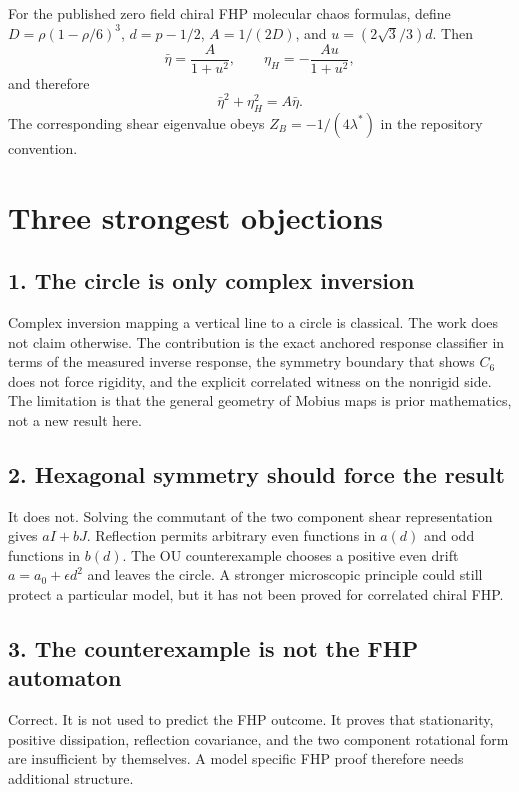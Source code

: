\documentclass[11pt,a4paper]{article}
\begin{document}
For the published zero field chiral FHP molecular chaos formulas, define $D=\rho(1-\rho/6)^3$, $d=p-1/2$, $A=1/(2D)$, and $u=(2\sqrt3/3)d$. Then
\begin{equation}
 \bar\eta=\frac{A}{1+u^2},\qquad
 \eta_H=-\frac{Au}{1+u^2},
\end{equation}
and therefore
\begin{equation}
 \bar\eta^2+\eta_H^2=A\bar\eta.
\end{equation}
The corresponding shear eigenvalue obeys $Z_B=-1/(4\lambda^*)$ in the repository convention.

\section*{Three strongest objections}
\subsection*{1. The circle is only complex inversion}
Complex inversion mapping a vertical line to a circle is classical. The work does not claim otherwise. The contribution is the exact anchored response classifier in terms of the measured inverse response, the symmetry boundary that shows $C_6$ does not force rigidity, and the explicit correlated witness on the nonrigid side. The limitation is that the general geometry of Mobius maps is prior mathematics, not a new result here.

\subsection*{2. Hexagonal symmetry should force the result}
It does not. Solving the commutant of the two component shear representation gives $aI+bJ$. Reflection permits arbitrary even functions in $a(d)$ and odd functions in $b(d)$. The OU counterexample chooses a positive even drift $a=a_0+\epsilon d^2$ and leaves the circle. A stronger microscopic principle could still protect a particular model, but it has not been proved for correlated chiral FHP.

\subsection*{3. The counterexample is not the FHP automaton}
Correct. It is not used to predict the FHP outcome. It proves that stationarity, positive dissipation, reflection covariance, and the two component rotational form are insufficient by themselves. A model specific FHP proof therefore needs additional structure.
\end{document}
